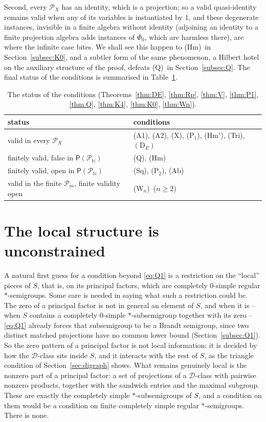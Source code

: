 \documentclass[11pt]{amsart}
\theoremstyle{definition}
\newcommand{\D}{\mathcal{D}}
\renewcommand{\P}{\mathcal{P}}      %
\newcommand{\PA}{\mathsf{P}}         %
\newcommand{\Tri}{\textup{(Tri)}}
\newcommand{\Wire}{\textup{(Sq)}}      %
\newcommand{\Rcond}{\textup{(A1)}}     %
\newcommand{\Rp}{\textup{(A2)}}        %
\newcommand{\Vcond}{\textup{(X)}}      %
\newcommand{\Pone}{\textup{(P$_1$)}}
\newcommand{\Ptwo}{\textup{(P$_2$)}}
\newcommand{\Qcond}{\textup{(Q)}}
\newcommand{\Kzero}{\textup{(Hm)}}     %
\newcommand{\Hmp}{\textup{(Hm$'$)}}     %
\newcommand{\Kfour}{\textup{(Ab)}}     %
\newcommand{\Wn}[1][n]{\textup{(W$_{#1}$)}}
\begin{document}
Second, every $\P_X$ has an identity, which is a projection; so a valid quasi-identity remains valid when any of its variables is instantiated by $1$, and these degenerate instances, invisible in a finite algebra without identity (adjoining an identity to a finite projection algebra adds instances of $\Phi_0$, which are harmless there), are where the infinite case bites. We shall see this happen to \Kzero\ in Section~\ref{subsec:K0}, and a subtler form of the same phenomenon, a Hilbert hotel on the auxiliary structure of the proof, defeats \Qcond\ in Section~\ref{subsec:Q}. The final status of the conditions is summarised in Table~\ref{tab:status}.

\begin{table}[htbp]
\centering
\begin{tabular}{@{}ll@{}}
\toprule
status & conditions\\
\midrule
valid in every $\P_X$ & \Rcond, \Rp, \Vcond, \Pone, \Hmp, \Tri, $(\mathrm D_E)$\\
finitely valid, false in $\PA(\P_{\mathbb N})$ & \Qcond, \Kzero\\
finitely valid, open in $\PA(\P_{\mathbb N})$ & \Wire, \Ptwo, \Kfour\\
valid in the finite $\P_m$, finite validity open & \Wn\ ($n\ge2$)\\
\bottomrule
\end{tabular}
\caption{The status of the conditions (Theorems~\ref{thm:DE}, \ref{thm:Rp}, \ref{thm:V}, \ref{thm:P1}, \ref{thm:Q}, \ref{thm:K4}, \ref{thm:K0}, \ref{thm:Wn}).}\label{tab:status}
\end{table}

\section{The local structure is unconstrained}\label{sec:local}

A natural first guess for a condition beyond \eqref{eq:Q1} is a restriction on the ``local'' pieces of $S$, that is, on its principal factors, which are completely $0$-simple regular $*$-semigroups. Some care is needed in saying what such a restriction could be. The zero of a principal factor is not in general an element of $S$, and when it is -- when $S$ contains a completely $0$-simple $*$-subsemigroup together with its zero -- \eqref{eq:Q1} already forces that subsemigroup to be a Brandt semigroup, since two distinct matched projections have no common lower bound (Section~\ref{subsec:Q1}). So the zero pattern of a principal factor is not local information: it is decided by how the $\D$-class sits inside $S$, and it interacts with the rest of $S$, as the triangle condition of Section~\ref{sec:digraph} shows. What remains genuinely local is the nonzero part of a principal factor: a set of projections of a $\D$-class with pairwise nonzero products, together with the sandwich entries and the maximal subgroup. These are exactly the completely simple $*$-subsemigroups of $S$, and a condition on them would be a condition on finite completely simple regular $*$-semigroups. There is none.
\end{document}
